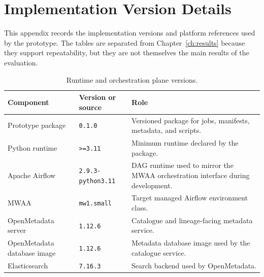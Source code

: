 \chapter{Implementation Version Details}
\label{chap:implementation-versions}
\noindent
This appendix records the implementation versions and platform references used
by the prototype. The tables are separated from Chapter~\ref{ch:results}
because they support repeatability, but they are not themselves the main
results of the evaluation.

\begin{table}[H]
  \centering
  \caption{Runtime and orchestration plane versions.}
  \label{tab:appendix-runtime-plane}
  \renewcommand{\arraystretch}{1.12}
  \begin{tabularx}{\textwidth}{@{}p{}p{}X@{}}
    \toprule
    \textbf{Component} & \textbf{Version or source} & \textbf{Role} \\
    \midrule
    Prototype package & \texttt{0.1.0} & Versioned package for jobs, manifests, metadata, and scripts. \\
    Python runtime & \texttt{>=3.11} & Minimum runtime declared by the package. \\
    Apache Airflow & \texttt{2.9.3-python3.11} & DAG runtime used to mirror the MWAA orchestration interface during development. \\
    MWAA & \texttt{mw1.small} & Target managed Airflow environment class. \\
    OpenMetadata server & \texttt{1.12.6} & Catalogue and lineage-facing metadata service. \\
    OpenMetadata database image & \texttt{1.12.6} & Metadata database image used by the catalogue service. \\
    Elasticsearch & \texttt{7.16.3} & Search backend used by OpenMetadata. \\
    \bottomrule
  \end{tabularx}
\end{table}

